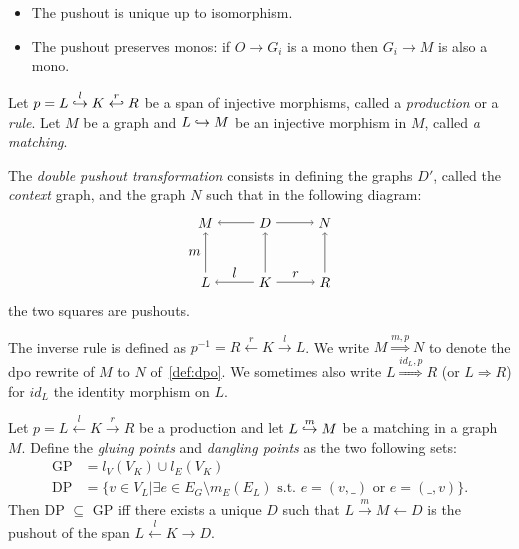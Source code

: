 \begin{property}
  \begin{itemize}
  \item The pushout is unique up to isomorphism.
  \item The pushout preserves monos: if $O\to G_i$ is a mono then $G_i\to M$ is also a mono.
  \end{itemize}
\end{property}

\begin{definition}
\label{def:dpo}
  Let $p = L\overset{l}{\hookrightarrow} K \overset{r}{\hookleftarrow} R$ be a span of injective morphisms, called a \emph{production} or a \emph{rule}. Let $M$ be a graph and $L\hookrightarrow M$ be an injective morphism in $M$, called \emph{a matching}.

  The \emph{double pushout transformation} consists in defining the graphs $D'$, called the \emph{context} graph, and the graph $N$ such that in the following diagram:
  \[
  \begin{tikzpicture} %
    \node (l) at (-1.5,0) {\(L\)};
    \node (d) at (0,0) {\(K\)};
    \node (r) at (1.5,0) {\(R\)};
    \node (m) at (-1.5,1.5) {\(M\)};
    \node (d') at (0,1.5) {\(D\)};
    \node (n) at (1.5,1.5) {\(N\)};
    \draw [->] (d) -- node [above,midway] {\(l\)} (l);
    \draw [->] (d) -- node [above,midway] {\(r\)} (r);
    \draw [->] (d') -- (m);
    \draw [->] (d') -- (n);
    \draw [->] (l) -- node [left,midway] {\(m\)}  (m);
    \draw [->] (d) -- (d');
    \draw [->] (r) -- (n);
  \end{tikzpicture}
  \]
  the two squares are pushouts.
\end{definition}

  The inverse rule is defined as $p^{-1} = R\overset{r}{\leftarrow} K \overset{l}{\rightarrow} L$.
  We write $M\overset{m,p}{\Rightarrow}N$ to denote the dpo rewrite of $M$ to $N$ of~\autoref{def:dpo}.
  We sometimes also write $L\overset{\mathit{id}_L,p}{\Rightarrow}R$ (or $L{\Rightarrow}R$) for
  $\mathit{id}_L$ the identity morphism on $L$.


\begin{property}
  Let $p = L\overset{l}{\leftarrow} K \overset{r}{\rightarrow} R$ be a production and let $L\overset{m}{\hookrightarrow} M$ be a matching in a graph $M$.
  Define the \emph{gluing points} and \emph{dangling points} as the two following sets:
  \begin{align*}
  \text{GP} &= l_V(V_K)\cup l_E(V_K)\\
  \text{DP} &= \{ v\in V_L \big| \exists e\in E_G\setminus m_E(E_L)\text{ s.t. }e=(v,\_)\text{ or }e=(\_, v)\}.
  \end{align*}
  Then DP $\subseteq$ GP iff there exists a unique $D$ such that $L\overset{m}{\rightarrow} M{\leftarrow} D$ is the pushout of the span $ L\overset{l}{\leftarrow} K {\rightarrow} D$.
\end{property}

